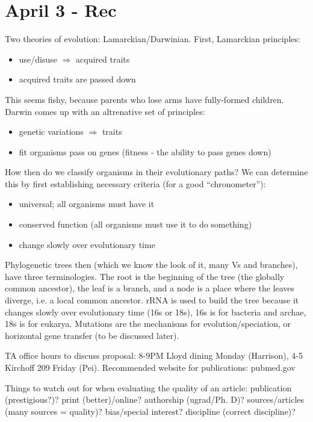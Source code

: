 \documentclass[12pt]{article}
\begin{document}
\section*{April 3 - Rec}

Two theories of evolution: Lamarckian/Darwinian. First, Lamarckian principles:

\begin{itemize}
	\item use/disuse $\Rightarrow$ acquired traits
	\item acquired traits are passed down
\end{itemize}

This seems fishy, because parents who lose arms have fully-formed children. Darwin comes up with an altrenative set of principles:

\begin{itemize}
	\item genetic variations $\Rightarrow$ traits
	\item fit organisms pass on genes (fitness - the ability to pass genes down)
\end{itemize}

How then do we classify organisms in their evolutionary paths? We can determine this by first establishing necessary criteria (for a good ``chronometer''):

\begin{itemize}
	\item universal; all organisms must have it
	\item conserved function (all organisms must use it to do something)
	\item change slowly over evolutionary time
\end{itemize}

Phylogenetic trees then (which we know the look of it, many Vs and branches), have three terminologies. The root is the beginning of the tree (the globally common ancestor), the leaf is a branch, and a node is a place where the leaves diverge, i.e. a local common ancestor. rRNA is used to build the tree because it changes slowly over evolutionary time (16s or 18s), 16s is for bacteria and archae, 18s is for eukarya. Mutations are the mechanisms for evolution/speciation, or horizontal gene transfer (to be discussed later). 

TA office hours to discuss proposal: 8-9PM Lloyd dining Monday (Harrison), 4-5 Kirchoff 209 Friday (Pei). Recommended website for publications: pubmed.gov

Things to watch out for when evaluating the quality of an article: publication (prestigious?)? print (better)/online? authorship (ugrad/Ph. D)? sources/articles (many sources = quality)? bias/special interest? discipline (correct discipline)?
\end{document}

